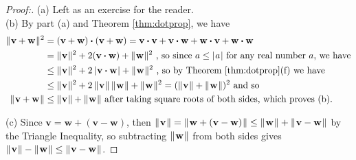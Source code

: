 \begin{proofbar}\begin{proof}[Proof:]
 (a) Left as an exercise for the reader.\smallskip\\(b) By part (a) and Theorem \ref{thm:dotprop}, we have
  \begin{align*}
   \lVert\mspace{1mu}\textbf{v} + \textbf{w}\mspace{1mu}\rVert^2 &= (\textbf{v} + \textbf{w}) \bm{\cdot} (\textbf{v} + \textbf{w})
   = \textbf{v} \bm{\cdot} \textbf{v} + \textbf{v} \bm{\cdot} \textbf{w} + \textbf{w} \bm{\cdot} \textbf{v} +
   \textbf{w} \bm{\cdot} \textbf{w}\\
   &= \lVert\mspace{1mu}\textbf{v}\mspace{1mu}\rVert^2 + 2(\textbf{v} \bm{\cdot} \textbf{w}) + \lVert\mspace{1mu}\textbf{w}\mspace{1mu}\rVert^2 \text{~, so since $a \le \lvert\mspace{1mu}a\mspace{1mu}\rvert$
    for any real number $a$, we have}\\
   &\le \lVert\mspace{1mu}\textbf{v}\mspace{1mu}\rVert^2 + 2\,\lvert\mspace{1mu}\textbf{v} \bm{\cdot} \textbf{w}\mspace{1mu}\rvert + \lVert\mspace{1mu}\textbf{w}\mspace{1mu}\rVert^2 
    \text{~, so by Theorem \ref{thm:dotprop}(f) we have}\\
   &\le \lVert\mspace{1mu}\textbf{v}\mspace{1mu}\rVert^2 + 2\,\lVert\mspace{1mu}\textbf{v}\mspace{1mu}\rVert\,\lVert\mspace{1mu}\textbf{w}\mspace{1mu}\rVert + \lVert\mspace{1mu}\textbf{w}\mspace{1mu}\rVert^2 =
    (\lVert\mspace{1mu}\textbf{v}\mspace{1mu}\rVert + \lVert\mspace{1mu}\textbf{w}\mspace{1mu}\rVert)^2 \text{~and so}\\
   \lVert\mspace{1mu}\textbf{v} + \textbf{w}\mspace{1mu}\rVert &\le \lVert\mspace{1mu}\textbf{v}\mspace{1mu}\rVert + \lVert\mspace{1mu}\textbf{w}\mspace{1mu}\rVert
    \text{~after taking square roots of both sides, which proves (b).}
  \end{align*}
  \par\noindent(c) Since $\textbf{v} = \textbf{w} + (\textbf{v} - \textbf{w})$, then $\lVert\mspace{1mu}\textbf{v}\mspace{1mu}\rVert = 
  \lVert\mspace{1mu}\textbf{w} + (\textbf{v} - \textbf{w})\mspace{1mu}\rVert \le \lVert\mspace{1mu}\textbf{w}\mspace{1mu}\rVert + \lVert\mspace{1mu}\textbf{v} - \textbf{w}\mspace{1mu}\rVert$
  by the Triangle Inequality, so subtracting $\lVert\mspace{1mu}\textbf{w}\mspace{1mu}\rVert$ from both sides gives
  $\lVert\mspace{1mu}\textbf{v}\mspace{1mu}\rVert - \lVert\mspace{1mu}\textbf{w}\mspace{1mu}\rVert \le \lVert\mspace{1mu}\textbf{v} - \textbf{w}\mspace{1mu}\rVert$. \qquad \qedhere 
\end{proof}\end{proofbar}

